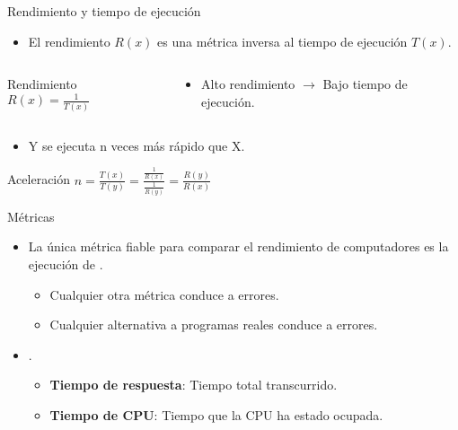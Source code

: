 \begin{frame}[t]{Rendimiento y tiempo de ejecución}
\begin{itemize}
  \item El rendimiento $R(x)$ es una métrica inversa al tiempo de 
        ejecución $T(x)$.
\end{itemize}
\begin{columns}
\begin{column}{.4\textwidth}
\begin{block}{Rendimiento}
\begin{math}
R(x) = \frac{1}{T(x)}
\end{math}
\end{block}
\end{column}
\begin{column}{.6\textwidth}
\begin{itemize}
  \item Alto rendimiento $\rightarrow$ Bajo tiempo de ejecución.
\end{itemize}
\end{column}
\end{columns}
\begin{itemize}
  \item Y se ejecuta n veces más rápido que X.
\end{itemize}
\begin{block}{Aceleración}
\begin{math}
n=\frac{T(x)}{T(y)}=
\frac{
\frac{1}{R(x)}
}{
\frac{1}{R(y)}
}
=
\frac{R(y)}{R(x)}
\end{math}
\end{block}
\end{frame}

\begin{frame}[t]{Métricas}
\begin{itemize}
  \item La \alert{única} métrica fiable para comparar el rendimiento de computadores 
        es la ejecución de .
    \begin{itemize}
      \item Cualquier otra métrica conduce a errores.
      \item Cualquier alternativa a programas reales conduce a errores.
    \end{itemize}
  \item {}.
    \begin{itemize}
      \item \textbf{Tiempo de respuesta}: 
            Tiempo total transcurrido.
      \item \textbf{Tiempo de CPU}: 
            Tiempo que la CPU ha estado ocupada.
    \end{itemize}
\end{itemize}
\end{frame}

